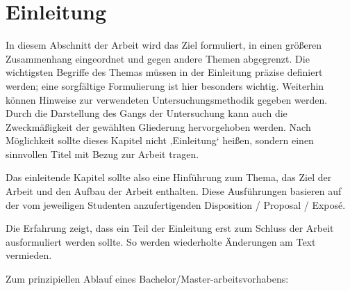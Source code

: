 \documentclass[11pt]{scrartcl}
\begin{document}
\section{Einleitung}
In diesem Abschnitt der Arbeit wird das Ziel formuliert, in einen größeren Zusammenhang eingeordnet und gegen andere Themen abgegrenzt. Die wichtigsten Begriffe des Themas müssen in der Einleitung präzise definiert werden; eine sorgfältige Formulierung ist hier besonders wichtig. Weiterhin können Hinweise zur verwendeten Untersuchungsmethodik gegeben werden. Durch die Darstellung des Gangs der Untersuchung kann auch die Zweckmäßigkeit der gewählten Gliederung hervorgehoben werden.  Nach Möglichkeit sollte dieses Kapitel nicht ‚Einleitung‘ heißen, sondern einen sinnvollen Titel mit Bezug zur Arbeit tragen.

Das einleitende Kapitel sollte also eine Hinführung zum Thema, das Ziel der Arbeit und den Aufbau der Arbeit enthalten. Diese Ausführungen basieren auf der vom jeweiligen Studenten anzufertigenden Disposition / Proposal / Exposé.

Die Erfahrung zeigt, dass ein Teil der Einleitung erst zum Schluss der Arbeit ausformuliert  werden sollte. So werden wiederholte Änderungen am Text vermieden.

Zum prinzipiellen Ablauf eines Bachelor/Master-arbeitsvorhabens:
\end{document}
